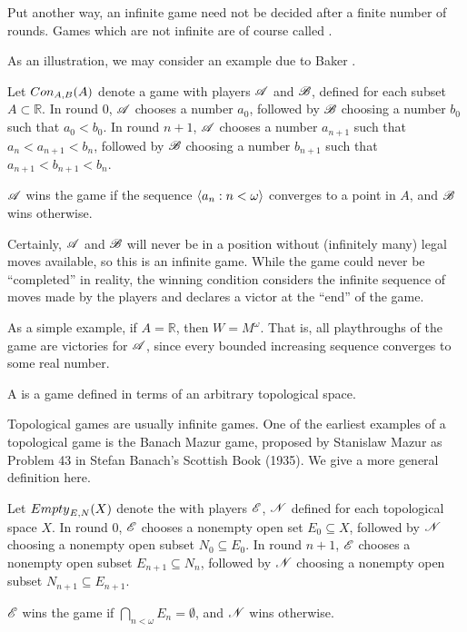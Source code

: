 Put another way, an infinite game need not be decided after a finite number
of rounds. Games which are not infinite are of course called
. 

As an illustration, we may consider an example due to 
Baker \cite{baker}. 

\begin{game}
  Let ${Con}_{A,B}(A)$ denote a game with players $\mathscr{A}$ and $\mathscr{B}$,
  defined for each subset $A\subset \mathbb{R}$.
  In round $0$, $\mathscr{A}$ chooses a number $a_0$, followed by $\mathscr{B}$ choosing
  a number $b_0$ such that $a_0<b_0$.
  In round $n+1$, $\mathscr{A}$ chooses a number $a_{n+1}$ such that 
  $a_n<a_{n+1}<b_n$, followed by $\mathscr{B}$ choosing a number $b_{n+1}$ such that
  $a_{n+1}<b_{n+1}<b_n$.

  $\mathscr{A}$ wins the game if the sequence $\langle a_n:n<\omega\rangle$ converges to a 
  point in $A$, and $\mathscr{B}$ wins otherwise.
\end{game}

Certainly, $\mathscr{A}$ and $\mathscr{B}$ will never be in
a position without (infinitely many) legal moves available, so this is
an infinite game. While the game could never be ``completed'' in reality,
the winning condition considers the infinite sequence of moves made by the
players and declares a victor at the ``end'' of the game.

As a simple example, if $A=\mathbb{R}$, then $W=M^\omega$. That is,
all playthroughs of the game are victories for $\mathscr{A}$, since every
bounded increasing sequence converges to some real number. 

\begin{defn}
  A  is a game defined in terms of an arbitrary
  topological space.
\end{defn}

Topological games are usually infinite games. One of the earliest examples
of a topological game is the Banach Mazur game, proposed by Stanislaw Mazur
as Problem 43 in Stefan Banach's Scottish Book (1935). We give a more
general definition here.

\begin{game}
  Let ${Empty}_{E,N}(X)$ denote the  with players $\mathscr{E}$,
  $\mathscr{N}$ defined for each topological space $X$.
  In round $0$, $\mathscr{E}$ chooses a nonempty open set $E_0\subseteq X$, followed
  by $\mathscr{N}$ choosing a nonempty open subset $N_0\subseteq E_0$.
  In round $n+1$, $\mathscr{E}$ chooses a nonempty open subset $E_{n+1}\subseteq N_n$, 
  followed by $\mathscr{N}$ choosing a nonempty open subset 
  $N_{n+1}\subseteq E_{n+1}$.

  $\mathscr{E}$ wins the game if $\bigcap_{n<\omega} E_n = \emptyset$, 
  and $\mathscr{N}$ wins otherwise.
\end{game}

